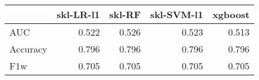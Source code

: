 \begin{tabular}{lrrrr}
\toprule
{} &  skl-LR-l1 &  skl-RF &  skl-SVM-l1 &  xgboost \\
\midrule
AUC      &      0.522 &   0.526 &       0.523 &    0.513 \\
Accuracy &      0.796 &   0.796 &       0.796 &    0.796 \\
F1w      &      0.705 &   0.705 &       0.705 &    0.705 \\
\bottomrule
\end{tabular}
